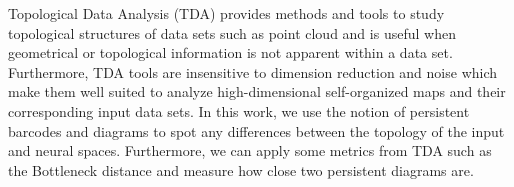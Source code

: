 
\label{sec:tda}

Topological Data Analysis (TDA) \citep{Carlsson:2009} provides methods and tools to study topological structures of data sets such as point cloud and is useful when geometrical or topological information is not apparent within a data set. Furthermore, TDA tools are insensitive to dimension reduction and noise which make them well suited to analyze high-dimensional self-organized maps and their corresponding input data sets. In this work, we use the notion of persistent barcodes and diagrams \citep{Edelsbrunner:2008} to spot any differences between the topology of the input and neural spaces. Furthermore, we can apply some metrics from TDA such as the Bottleneck distance and measure how close two persistent diagrams are.

